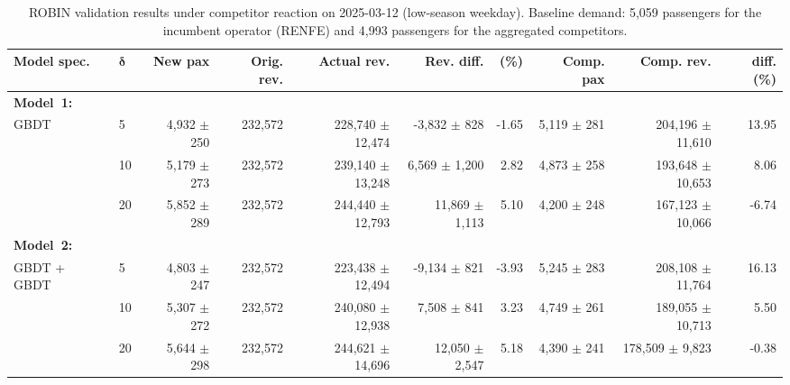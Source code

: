 \begin{table}[!h]
    \centering
    \caption{ROBIN validation results under competitor reaction on 2025-03-12 (low-season weekday). Baseline demand: 5,059 passengers for the incumbent operator (RENFE) and 4,993 passengers for the aggregated competitors.}
    \label{tab:model2_validation_2025_03_12}
    \scriptsize
    \setlength{\tabcolsep}{3pt}
    \begin{tabular}{llrrrrrrrr}
        \toprule
        \textbf{Model spec.}
        & \(\boldsymbol{\delta}\)
        & \textbf{New pax}
        & \textbf{Orig. rev.}
        & \textbf{Actual rev.}
        & \textbf{Rev. diff.}
        & \textbf{(\%)}
        & \textbf{Comp. pax}
        & \textbf{Comp. rev.}
        & \textbf{diff. (\%)} \\
        \midrule
        \multicolumn{10}{l}{\textbf{Model~1:}} \\[1ex]
        \multirow{3}{*}{GBDT} & 5 & 4,932 $\pm$ 250 & 232,572 & 228,740 $\pm$ 12,474 & -3,832 $\pm$ 828 & -1.65 & 5,119 $\pm$ 281 & 204,196 $\pm$ 11,610 & 13.95 \\
         & 10 & 5,179 $\pm$ 273 & 232,572 & 239,140 $\pm$ 13,248 & 6,569 $\pm$ 1,200 & 2.82 & 4,873 $\pm$ 258 & 193,648 $\pm$ 10,653 & 8.06 \\
         & 20 & 5,852 $\pm$ 289 & 232,572 & 244,440 $\pm$ 12,793 & 11,869 $\pm$ 1,113 & 5.10 & 4,200 $\pm$ 248 & 167,123 $\pm$ 10,066 & -6.74 \\
        \midrule
        \multicolumn{10}{l}{\textbf{Model~2:}} \\
        \multirow{3}{*}{GBDT + GBDT} & 5 & 4,803 $\pm$ 247 & 232,572 & 223,438 $\pm$ 12,494 & -9,134 $\pm$ 821 & -3.93 & 5,245 $\pm$ 283 & 208,108 $\pm$ 11,764 & 16.13 \\
         & 10 & 5,307 $\pm$ 272 & 232,572 & 240,080 $\pm$ 12,938 & 7,508 $\pm$ 841 & 3.23 & 4,749 $\pm$ 261 & 189,055 $\pm$ 10,713 & 5.50 \\
         & 20 & 5,644 $\pm$ 298 & 232,572 & 244,621 $\pm$ 14,696 & 12,050 $\pm$ 2,547 & 5.18 & 4,390 $\pm$ 241 & 178,509 $\pm$ 9,823 & -0.38 \\
        \bottomrule
    \end{tabular}
\end{table}